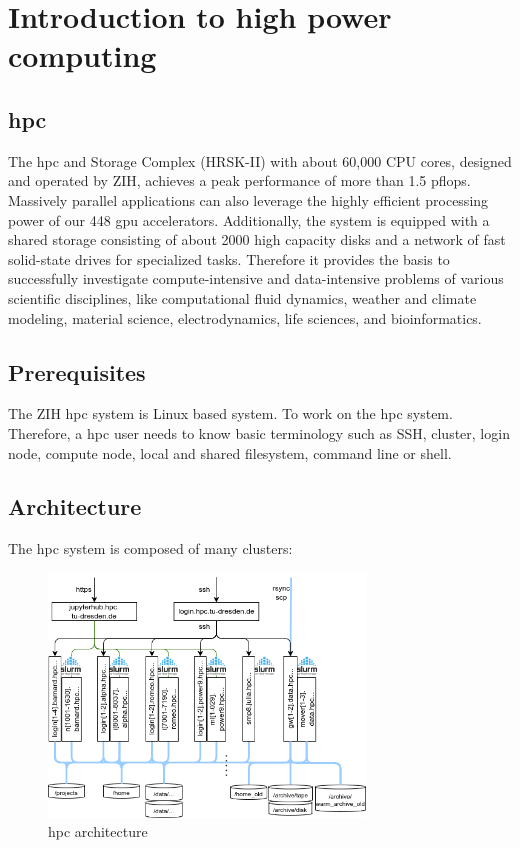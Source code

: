 \section{Introduction to high power computing}
\subsection{\acrshort{hpc}}
The \acrlong{hpc} and Storage Complex (HRSK-II) with about 60,000 CPU cores, designed and operated by ZIH, achieves a peak performance of more than 1.5 \acrfull{pflops}. Massively parallel applications can also leverage the highly efficient processing power of our 448 \acrshort{gpu} accelerators. Additionally, the system is equipped with a shared storage consisting of about 2000 high capacity disks and a network of fast solid-state drives for specialized tasks. Therefore it provides the basis to successfully investigate compute-intensive and data-intensive problems of various scientific disciplines, like computational fluid dynamics, weather and climate modeling, material science, electrodynamics, life sciences, and bioinformatics.
\subsection{Prerequisites}
The ZIH \acrshort{hpc} system is Linux based system. To work on the \acrshort{hpc} system. Therefore, a \acrshort{hpc} user needs to know basic terminology such as SSH, cluster, login node, compute node, local and shared filesystem, command line or shell.

\subsection{Architecture}
The \acrshort{hpc} system is composed of many clusters:

\begin{figure}[hp]
	\centering
	\includegraphics[width=0.75\textwidth]{Figures/HPCArchitecture.png}
	\caption{\acrshort{hpc} architecture}
\end{figure}

